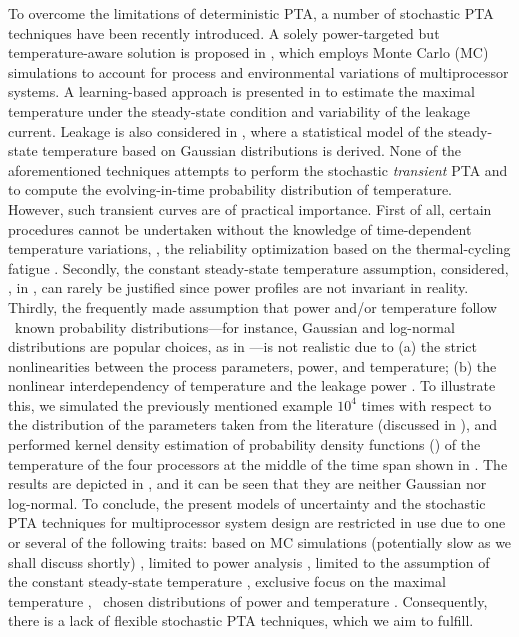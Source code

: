 

To overcome the limitations of deterministic PTA, a number of stochastic PTA techniques have been recently introduced. A solely power-targeted but temperature-aware solution is proposed in \cite{chandra2010}, which employs Monte Carlo (MC) simulations to account for process and environmental variations of multiprocessor systems. A learning-based approach is presented in \cite{juan2011} to estimate the maximal temperature under the steady-state condition and variability of the leakage current. Leakage is also considered in \cite{juan2012}, where a statistical model of the steady-state temperature based on Gaussian distributions is derived. None of the aforementioned techniques attempts to perform the stochastic \emph{transient} PTA and to compute the evolving-in-time probability distribution of temperature. However, such transient curves are of practical importance. First of all, certain procedures cannot be undertaken without the knowledge of time-dependent temperature variations, \eg, the reliability optimization based on the thermal-cycling fatigue \cite{ukhov2012}. Secondly, the constant steady-state temperature assumption, considered, \eg, in \cite{juan2011, juan2012}, can rarely be justified since power profiles are not invariant in reality. Thirdly, the frequently made assumption that power and/or temperature follow \apriori\ known probability distributions---for instance, Gaussian and log-normal distributions are popular choices, as in \cite{juan2012, srivastava2010}---is not realistic due to (a) the strict nonlinearities between the process parameters, power, and temperature; (b) the nonlinear interdependency of temperature and the leakage power \cite{liu2007}. To illustrate this, we simulated the previously mentioned example $10^4$ times with respect to the distribution of the parameters taken from the literature (discussed in ), and performed kernel density estimation of probability density functions (\pdfs) of the temperature of the four processors at the middle of the time span shown in . The results are depicted in , and it can be seen that they are neither Gaussian nor log-normal. To conclude, the present models of uncertainty and the stochastic PTA techniques for multiprocessor system design are restricted in use due to one or several of the following traits: based on MC simulations (potentially slow as we shall discuss shortly) \cite{chandra2010}, limited to power analysis \cite{chandra2010}, limited to the assumption of the constant steady-state temperature \cite{juan2011, juan2012}, exclusive focus on the maximal temperature \cite{juan2011}, \apriori\ chosen distributions of power and temperature \cite{juan2012, srivastava2010}. Consequently, there is a lack of flexible stochastic PTA techniques, which we aim to fulfill.


